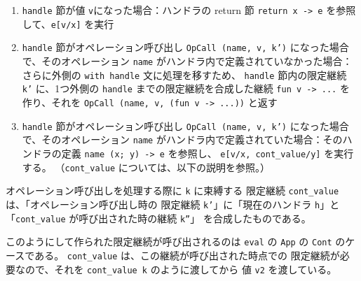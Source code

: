 \begin{enumerate}
\item \texttt{handle} 節が値 \texttt{v}になった場合：ハンドラの return 節 \texttt{return x -> e} を参照して、\texttt{e[v/x]} を実行
\item \texttt{handle} 節がオペレーション呼び出し \texttt{OpCall (name, v, k')} になった場合で、そのオペレーション \texttt{name} がハンドラ内で定義されていなかった場合：
さらに外側の \texttt{with handle} 文に処理を移すため、
\texttt{handle} 節内の限定継続 \texttt{k'} に、1つ外側の \texttt{handle} までの限定継続を合成した継続 \texttt{fun v -> ...} を作り、それを \texttt{OpCall (name, v, (fun v -> ...))} と返す
\item \texttt{handle} 節がオペレーション呼び出し \texttt{OpCall (name, v, k')} になった場合で、そのオペレーション \texttt{name} がハンドラ内で定義されていた場合：そのハンドラの定義 \texttt{name (x; y) -> e} を参照し、
\texttt{e[v/x, cont\_value/y]} を実行する。
（\texttt{cont\_value} については、以下の説明を参照。）
\end{enumerate}

オペレーション呼び出しを処理する際に \texttt{k} に束縛する
限定継続 \texttt{cont\_value} は、「オペレーション呼び出し時の
限定継続 \texttt{k'}」に「現在のハンドラ \texttt{h}」と
「\texttt{cont\_value} が呼び出された時の継続 \texttt{k''}」
を合成したものである。

このようにして作られた限定継続が呼び出されるのは \texttt{eval} の
\texttt{App} の \texttt{Cont} のケースである。
\texttt{cont\_value} は、この継続が呼び出された時点での
限定継続が必要なので、それを \texttt{cont\_value k} のように渡してから
値 \texttt{v2} を渡している。

